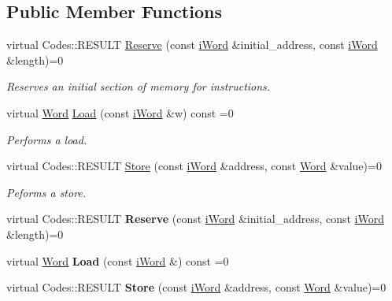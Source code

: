 \subsection*{Public Member Functions}
\begin{DoxyCompactItemize}
\item 
virtual Codes::RESULT \hyperlink{classiMemory_a27750e74d09fb473c163a4cc4c3e697b}{Reserve} (const \hyperlink{classiWord}{iWord} \&initial\_\-address, const \hyperlink{classiWord}{iWord} \&length)=0
\begin{DoxyCompactList}\small\item\em Reserves an initial section of memory for instructions. \item\end{DoxyCompactList}\item 
virtual \hyperlink{classWord}{Word} \hyperlink{classiMemory_a3352ba391fc9b69a0b8691b2d585596a}{Load} (const \hyperlink{classiWord}{iWord} \&w) const =0
\begin{DoxyCompactList}\small\item\em Performs a load. \item\end{DoxyCompactList}\item 
virtual Codes::RESULT \hyperlink{classiMemory_a2632c9999797b0799a7d6b0a59bfa91a}{Store} (const \hyperlink{classiWord}{iWord} \&address, const \hyperlink{classWord}{Word} \&value)=0
\begin{DoxyCompactList}\small\item\em Peforms a store. \item\end{DoxyCompactList}\item 
\hypertarget{classiMemory_a27750e74d09fb473c163a4cc4c3e697b}{
virtual Codes::RESULT {\bfseries Reserve} (const \hyperlink{classiWord}{iWord} \&initial\_\-address, const \hyperlink{classiWord}{iWord} \&length)=0}
\label{classiMemory_a27750e74d09fb473c163a4cc4c3e697b}

\item 
\hypertarget{classiMemory_a58fea9cebc1beb89503898d2d5f79bcd}{
virtual \hyperlink{classWord}{Word} {\bfseries Load} (const \hyperlink{classiWord}{iWord} \&) const =0}
\label{classiMemory_a58fea9cebc1beb89503898d2d5f79bcd}

\item 
\hypertarget{classiMemory_a2632c9999797b0799a7d6b0a59bfa91a}{
virtual Codes::RESULT {\bfseries Store} (const \hyperlink{classiWord}{iWord} \&address, const \hyperlink{classWord}{Word} \&value)=0}
\label{classiMemory_a2632c9999797b0799a7d6b0a59bfa91a}

\end{DoxyCompactItemize}



